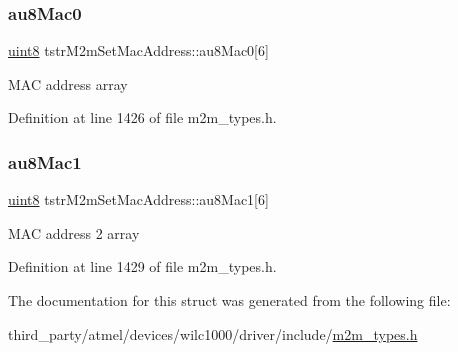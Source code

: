 \subsubsection{\texorpdfstring{au8\+Mac0}{au8Mac0}}
{\footnotesize\ttfamily \hyperlink{group__DataT_ga4df709a77647e870bbf1d955b8edc9a6}{uint8} tstr\+M2m\+Set\+Mac\+Address\+::au8\+Mac0\mbox{[}6\mbox{]}}

M\+AC address array 

Definition at line 1426 of file m2m\+\_\+types.\+h.

\mbox{\label{structtstrM2mSetMacAddress_a3f409e492cbbee5518c4f80608776ec6}} 
\subsubsection{\texorpdfstring{au8\+Mac1}{au8Mac1}}
{\footnotesize\ttfamily \hyperlink{group__DataT_ga4df709a77647e870bbf1d955b8edc9a6}{uint8} tstr\+M2m\+Set\+Mac\+Address\+::au8\+Mac1\mbox{[}6\mbox{]}}

M\+AC address 2 array 

Definition at line 1429 of file m2m\+\_\+types.\+h.



The documentation for this struct was generated from the following file\+:\begin{DoxyCompactItemize}
\item 
third\+\_\+party/atmel/devices/wilc1000/driver/include/\hyperlink{m2m__types_8h}{m2m\+\_\+types.\+h}\end{DoxyCompactItemize}

